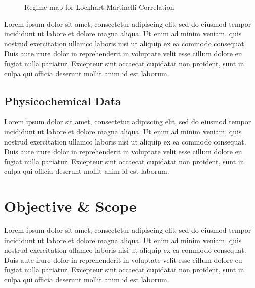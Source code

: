 \documentclass[a4paper,12pt]{report}
\begin{document}
\begin{figure}[h]
    \centering
    \caption{Regime map for Lockhart-Martinelli Correlation}
\end{figure}

Lorem ipsum dolor sit amet, consectetur adipiscing elit, sed do eiusmod tempor incididunt ut labore et dolore magna aliqua. Ut enim ad minim veniam, quis nostrud exercitation ullamco laboris nisi ut aliquip ex ea commodo consequat. Duis aute irure dolor in reprehenderit in voluptate velit esse cillum dolore eu fugiat nulla pariatur. Excepteur sint occaecat cupidatat non proident, sunt in culpa qui officia deserunt mollit anim id est laborum.

\subsection{Physicochemical Data}
Lorem ipsum dolor sit amet, consectetur adipiscing elit, sed do eiusmod tempor incididunt ut labore et dolore magna aliqua. Ut enim ad minim veniam, quis nostrud exercitation ullamco laboris nisi ut aliquip ex ea commodo consequat. Duis aute irure dolor in reprehenderit in voluptate velit esse cillum dolore eu fugiat nulla pariatur. Excepteur sint occaecat cupidatat non proident, sunt in culpa qui officia deserunt mollit anim id est laborum.

\newpage

\section[Objective \& Scope]{Objective \& Scope}
Lorem ipsum dolor sit amet, consectetur adipiscing elit, sed do eiusmod tempor incididunt ut labore et dolore magna aliqua. Ut enim ad minim veniam, quis nostrud exercitation ullamco laboris nisi ut aliquip ex ea commodo consequat. Duis aute irure dolor in reprehenderit in voluptate velit esse cillum dolore eu fugiat nulla pariatur. Excepteur sint occaecat cupidatat non proident, sunt in culpa qui officia deserunt mollit anim id est laborum.
\end{document}
